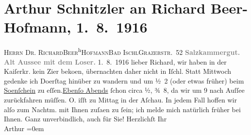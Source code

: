 

         
         \renewcommand{\erwaehntePersonen}{Personen: Richard Beer-Hofmann, Olga Schnitzler}
         \renewcommand{\erwaehnteOrte}{Orte: Altaussee, Aschau, Bad Ischl, Grazer Straße, Hotel Kaiserkrone, Loser, Restaurant Sonnenschein, Salzkammergut}
         \renewcommand{\erwaehnteWerke}{}
               \section[Arthur Schnitzler an Richard Beer-Hofmann, 1. 8. 1916]{ Arthur Schnitzler an Richard Beer-Hofmann, 1. 8. 1916}\nopagebreak{}\rehead{ }\begin{ledgroupsized}[t]{13cm}\normalsize\beginnumbering \toendnotes[C]{\smallbreak\pagebreak[2]} 
\pstart{}{\pb}\textsc{Herrn Dr. Richard}\pend{}\pstart{}\textsc{Beer}\substVorne{}\textsuperscript{h}\substDazwischen{}\textsc{H}\substHinten{}\textsc{ofmann}\pend{}\pstart{}\textsc{Bad Ischl}\pend{}\pstart{}\textsc{Grazerstr. 52}\pend{}{\bigskip}\pstart
           \noindent{}\centering{}{\pb}\textcolor{gray}{\textbf{Salzkammergut. Alt Aussee mit dem Loser.}}\pend
           \pstart
           \raggedleft{}{\pb}1. 8. 1916\pend
           \pstart
           lieber Richard, wir haben in der Kaiſerkr. kein Zi{\geminationm}er beko{\geminationm}en, übernachten daher nicht in Iſchl. Statt Mittwoch gedenke ich Do{\geminationn}erſtag hinüber zu wandern und um
                  ½ 2 (oder etwas früher) beim \uline{So{\geminationn}enſchein} zu eſſen.\strikeout{)}{ }\uline{Ebenſo Abends} ſchon circa ½, ¾ 8, da wir
               um 9 nach Auſſee zurückfahren müſſen.
                  O. iſſt zu Mittag in der Aſchau. In jedem Fall hoffen wir alſo zum Nachtm. mit Ihnen
                  zuſa{\geminationm}en zu ſein; ich melde mich natürlich früher {\pb}bei Ihnen. Ganz unverbindlich, auch für Sie!\pend
           \pstart
           Herzlichſt Ihr{\\[\baselineskip]}\spacefill\mbox{Arthur}\pend
           \leftskip=0em{}
         
         \endnumbering{}\end{ledgroupsized}  \newcommand{\dateiname}{L02236}\newcommand{\titel}{Arthur Schnitzler an Richard Beer-Hofmann, 1. 8. 1916}\newcommand{\editorInnen}{Martin Anton Müller und Gerd-Hermann Susen}
      